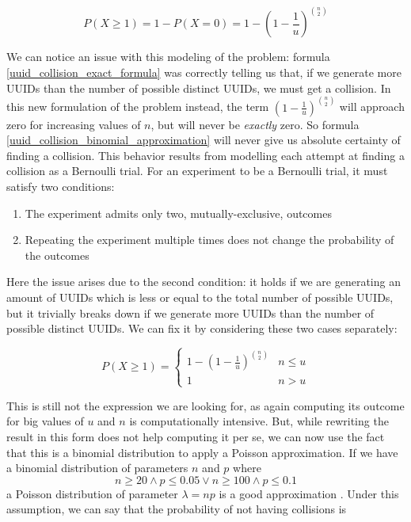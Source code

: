 \documentclass{report}
\begin{document}
\begin{equation} \label{uuid_collision_binomial_approximation}
		P(X \geq 1)=1-P(X=0)=1-(1-\frac{1}{u})^{\binom{n}{2}}
\end{equation}

We can notice an issue with this modeling of the problem: formula \ref{uuid_collision_exact_formula} was correctly telling us that, if we generate more UUIDs than the number of
possible distinct UUIDs, we must get a collision. In this new formulation of the problem instead, the term $(1-\frac{1}{u})^{\binom{n}{2}}$ will approach zero for increasing values of
$n$, but will never be \emph{exactly} zero. So formula \ref{uuid_collision_binomial_approximation} will never give us absolute certainty of finding a collision. This behavior
results from modelling each attempt at finding a collision as a Bernoulli trial. For an experiment to be a Bernoulli trial, it must satisfy two conditions: 
\begin{enumerate}
		\item The experiment admits only two, mutually-exclusive, outcomes
		\item Repeating the experiment multiple times does not change the probability of the outcomes
\end{enumerate}
Here the issue arises due to the second condition: it holds if we are generating an amount of UUIDs which is less or equal to the total number of possible UUIDs, but it trivially
breaks down if we generate more UUIDs than the number of possible distinct UUIDs. We can fix it by considering these two cases separately:

\begin{equation} \label{uuid_collision_binomial_model}
		P(X \geq 1)=
		\begin{cases}
				1-(1-\frac{1}{u})^{\binom{n}{2}} & n \leq u \\
				1 & n > u
		\end{cases}
\end{equation}

This is still not the expression we are looking for, as again computing its outcome for big values of $u$ and $n$ is computationally intensive.
But, while rewriting the result in this form does not help computing it per se, we can now use the fact that this is a binomial distribution to apply a Poisson approximation. If we have
a binomial distribution of parameters $n$ and $p$ where 
\begin{equation}\label{condition_for_poisson_approximation}
	n \geq 20 \land p \leq 0.05 \lor n \geq 100 \land p \leq 0.1 
\end{equation}
a Poisson distribution of parameter $\lambda=np$ is a good approximation \cite{source_for_poisson_approximation}. Under this assumption, we can say that the
probability of not having collisions is
\end{document}
